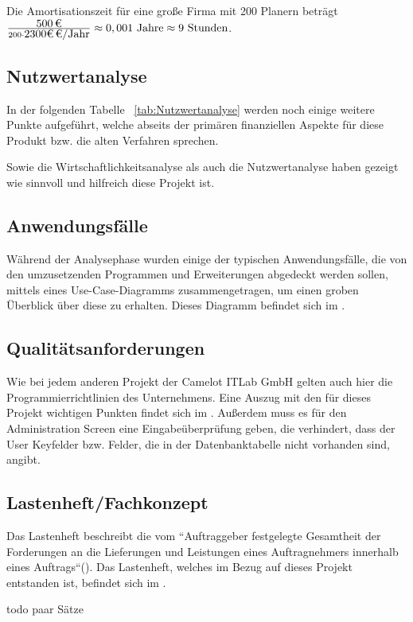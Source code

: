Die Amortisationszeit für eine große Firma mit 200 Planern beträgt
$\frac{\eur{500}}{200 \cdot \eur{2300€} \mbox{/Jahr} } \approx 0,001 \mbox{ Jahre} \approx 9 \mbox{ Stunden}$.

\subsection{Nutzwertanalyse}
\label{sec:Nutzwertanalyse}
In der folgenden Tabelle ~\ref{tab:Nutzwertanalyse} werden noch einige weitere Punkte aufgeführt, welche abseits der primären finanziellen Aspekte für diese Produkt bzw. die alten Verfahren sprechen.


Sowie die Wirtschaftlichkeitsanalyse als auch die Nutzwertanalyse haben gezeigt wie sinnvoll und hilfreich diese Projekt ist.

\subsection{Anwendungsfälle}
\label{sec:Anwendungsfaelle}
Während der Analysephase wurden einige der typischen Anwendungsfälle, die von den umzusetzenden Programmen und Erweiterungen abgedeckt werden sollen, mittels eines Use-Case-Diagramms zusammengetragen, um einen groben Überblick über diese zu erhalten. Dieses Diagramm befindet sich im .

\subsection{Qualitätsanforderungen}
\label{sec:Qualitaetsanforderungen}
Wie bei jedem anderen Projekt der Camelot ITLab GmbH gelten auch hier die Programmierrichtlinien des Unternehmens. Eine Auszug mit den für dieses Projekt wichtigen Punkten findet sich im . Außerdem muss es für den Administration Screen eine Eingabeüberprüfung geben, die verhindert, dass der User Keyfelder bzw. Felder, die in der Datenbanktabelle nicht vorhanden sind, angibt.

\subsection{Lastenheft/Fachkonzept}
\label{sec:Lastenheft}
Das Lastenheft beschreibt die vom ``Auftraggeber festgelegte Gesamtheit der Forderungen an die Lieferungen und Leistungen eines Auftragnehmers innerhalb eines Auftrags``(\cite{Wiki.Induux}). Das Lastenheft, welches im Bezug auf dieses Projekt entstanden ist, befindet sich im . 


todo paar Sätze